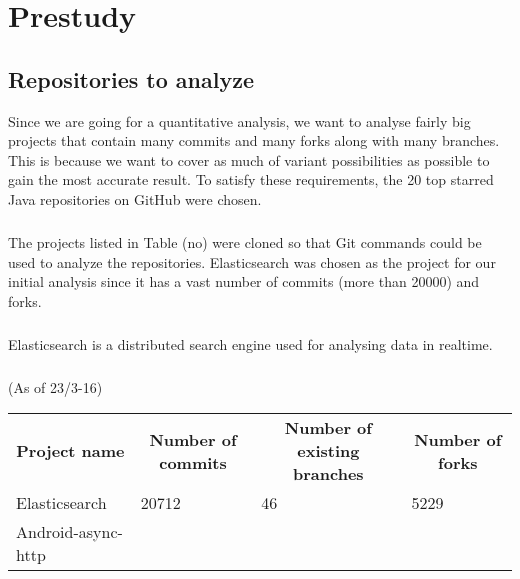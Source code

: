 \chapter{Prestudy}
\section{Repositories to analyze}
Since we are going for a quantitative analysis, we want to analyse fairly big projects that contain many commits and many forks along with many branches. This is because we want to cover as much of variant possibilities as possible to gain the most accurate result. To satisfy these requirements, the 20 top starred Java repositories on GitHub were chosen.
\paragraph*{}
The projects listed in Table (no) were cloned so that Git commands could be used to analyze the repositories. Elasticsearch was chosen as the project for our initial analysis since it has a vast number of commits (more than 20000) and forks.
\paragraph*{}
Elasticsearch is a distributed search engine used for analysing data in realtime. 
\paragraph*{}
(As of 23/3-16)
\begin{tabular}{ l l l l}
\hline
\multicolumn{1}{c}{\textbf{Project name}} & \multicolumn{1}{c}{\textbf{Number of commits}} & \multicolumn{1}{c}{\textbf{Number of existing branches}} & \multicolumn{1}{c}{\textbf{Number of forks}}\\
Elasticsearch & 20712 & 46 & 5229\\
Android-async-http & 


\end{tabular}